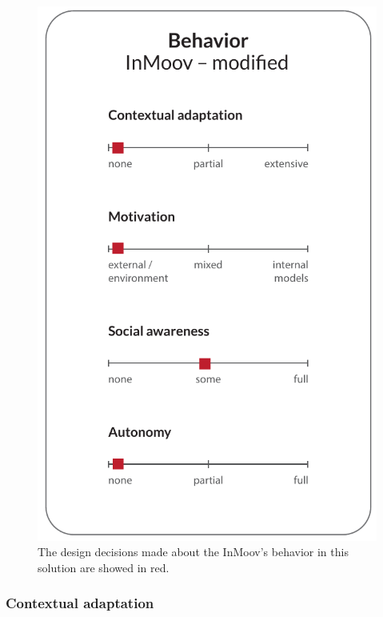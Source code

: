 \begin{figure}
\centering
  \includegraphics[scale=0.75]{images/solution_inmoov_final-05.pdf}
  \caption{The design decisions made about the InMoov's behavior in this solution are showed in red.}
  \label{fig:behaviorFinal}
\end{figure}


\subsubsection{Contextual adaptation}

